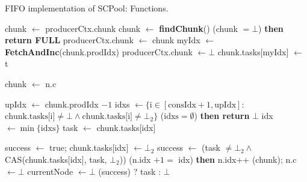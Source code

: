 \begin{algo}[!ht]
\caption{FIFO implementation of SCPool: Functions.} 
\label{alg:fifo}
\scriptsize
\begin{minipage}[t]{0.48\textwidth}
\begin{distribalgo}[1]
\setcounter{ALC@line}{\value{alg:fifo:lines}}
\smallskip
{}
		\STATE chunk $\leftarrow$ producerCtx.chunk
			\STATE chunk $\leftarrow$ {\bf findChunk}()
			 (chunk $= \bot$) {\bf then return FULL}
			\STATE producerCtx.chunk $\leftarrow$ chunk
		\ENDINDENT
		\STATE myIdx $\leftarrow$ {\bf FetchAndInc}(chunk.prodIdx)
			\STATE producerCtx.chunk $\leftarrow \bot$ 
		\ENDINDENT 
			\STATE chunk.tasks[myIdx] $\leftarrow$ t
		\ENDINDENT
	\ENDINDENT
\ENDINDENT

\medskip

  \STATE chunk $\leftarrow$ n.c
  
 	\STATE upIdx $\leftarrow$ chunk.prodIdx $-1$
 	\STATE idxs $\leftarrow \{\textrm{i} \in [\textrm{consIdx}+1,\textrm{upIdx}]:$ \\
 	\hspace{0.5cm}$\textrm{chunk.tasks[i]} \neq \bot \wedge \textrm{chunk.tasks[i]} \neq \bot_2\} $ 
   ($\textrm{idxs} = \emptyset$) {\bf then return} $\bot$
  \STATE idx $\leftarrow \min\{\textrm{idxs}\}$
  \STATE task $\leftarrow$ chunk.tasks[idx]
 	
 	\smallskip 
 		\STATE success $\leftarrow$ true; chunk.tasks[idx] $\leftarrow \bot_2$
 	\ENDINDENT
 		\STATE success $\leftarrow$ (task $\neq \bot_2 \wedge $ CAS(chunk.tasks[idx], task, $\bot_2$))
 	\ENDINDENT
 	(n.idx $+1 = $ idx) {\bf then} n.idx++
  	(chunk); n.c $\leftarrow \bot$
  	\STATE currentNode $\leftarrow \bot$
  \ENDINDENT
 	 (success) ? task : $\bot$
\ENDINDENT

\setcounter{alg:fifo:lines}{\value{ALC@line}} %
\end{distribalgo}
\end{minipage}%
%
\hfill
%
\begin{minipage}[t]{0.48\textwidth}
%
\begin{distribalgo}[1]
\setcounter{ALC@line}{\value{alg:fifo:lines}}
\smallskip


\end{distribalgo}
\end{minipage}
\end{algo}
